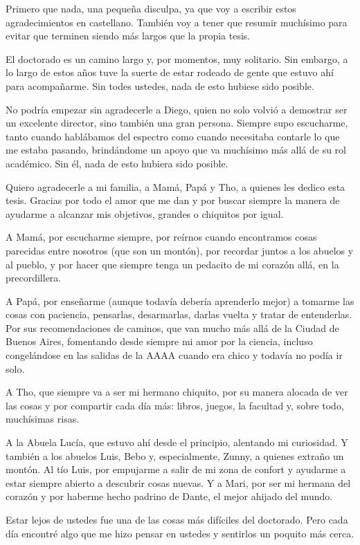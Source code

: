Primero que nada, una pequeña disculpa, ya que voy a escribir estos agradecimientos en castellano. También voy a tener que resumir muchísimo para evitar que terminen siendo más largos que la propia tesis.

El doctorado es un camino largo y, por momentos, muy solitario. Sin embargo, a lo largo de estos años tuve la suerte de estar rodeado de gente que estuvo ahí para acompañarme. Sin todes ustedes, nada de esto hubiese sido posible.

No podría empezar sin agradecerle a Diego, quien no solo volvió a demostrar ser un excelente director, sino también una gran persona. Siempre supo escucharme, tanto cuando hablábamos del espectro como cuando necesitaba contarle lo que me estaba pasando, brindándome un apoyo que va muchísimo más allá de su rol académico. Sin él, nada de esto hubiera sido posible.

Quiero agradecerle a mi familia, a Mamá, Papá y Tho, a quienes les dedico esta tesis. Gracias por todo el amor que me dan y por buscar siempre la manera de ayudarme a alcanzar mis objetivos, grandes o chiquitos por igual.

A Mamá, por escucharme siempre, por reírnos cuando encontramos cosas parecidas entre nosotros (que son un montón), por recordar juntos a los abuelos y al pueblo, y por hacer que siempre tenga un pedacito de mi corazón allá, en la precordillera.

A Papá, por enseñarme (aunque todavía debería aprenderlo mejor) a tomarme las cosas con paciencia, pensarlas, desarmarlas, darlas vuelta y tratar de entenderlas. Por sus recomendaciones de caminos, que van mucho más allá de la Ciudad de Buenos Aires, fomentando desde siempre mi amor por la ciencia, incluso congelándose en las salidas de la AAAA cuando era chico y todavía no podía ir solo.

A Tho, que siempre va a ser mi hermano chiquito, por su manera alocada de ver las cosas y por compartir cada día más: libros, juegos, la facultad y, sobre todo, muchísimas risas.

A la Abuela Lucía, que estuvo ahí desde el principio, alentando mi curiosidad. Y también a los abuelos Luis, Bebo y, especialmente, Zunny, a quienes extraño un montón. Al tío Luis, por empujarme a salir de mi zona de confort y ayudarme a estar siempre abierto a descubrir cosas nuevas. Y a Mari, por ser mi hermana del corazón y por haberme hecho padrino de Dante, el mejor ahijado del mundo.

Estar lejos de ustedes fue una de las cosas más difíciles del doctorado. Pero cada día encontré algo que me hizo pensar en ustedes y sentirlos un poquito más cerca.


